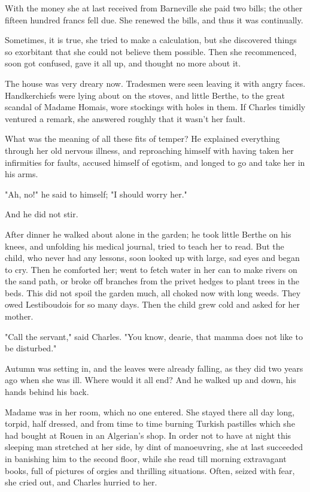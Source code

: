 \documentclass[11pt,twocolumn]{ltugboat}
\begin{document}
With the money she at last received from Barneville she paid two bills;
the other fifteen hundred francs fell due. She renewed the bills, and
thus it was continually.

Sometimes, it is true, she tried to make a calculation, but she
discovered things so exorbitant that she could not believe them
possible. Then she recommenced, soon got confused, gave it all up, and
thought no more about it.

The house was very dreary now. Tradesmen were seen leaving it with angry
faces. Handkerchiefs were lying about on the stoves, and little Berthe,
to the great scandal of Madame Homais, wore stockings with holes in
them. If Charles timidly ventured a remark, she answered roughly that it
wasn't her fault.

What was the meaning of all these fits of temper? He explained
everything through her old nervous illness, and reproaching himself with
having taken her infirmities for faults, accused himself of egotism, and
longed to go and take her in his arms.

"Ah, no!" he said to himself; "I should worry her."

And he did not stir.

After dinner he walked about alone in the garden; he took little Berthe
on his knees, and unfolding his medical journal, tried to teach her
to read. But the child, who never had any lessons, soon looked up with
large, sad eyes and began to cry. Then he comforted her; went to fetch
water in her can to make rivers on the sand path, or broke off branches
from the privet hedges to plant trees in the beds. This did not spoil
the garden much, all choked now with long weeds. They owed Lestiboudois
for so many days. Then the child grew cold and asked for her mother.

"Call the servant," said Charles. "You know, dearie, that mamma does not
like to be disturbed."

Autumn was setting in, and the leaves were already falling, as they did
two years ago when she was ill. Where would it all end? And he walked up
and down, his hands behind his back.

Madame was in her room, which no one entered. She stayed there all
day long, torpid, half dressed, and from time to time burning Turkish
pastilles which she had bought at Rouen in an Algerian's shop. In order
not to have at night this sleeping man stretched at her side, by dint of
manoeuvring, she at last succeeded in banishing him to the second floor,
while she read till morning extravagant books, full of pictures of
orgies and thrilling situations. Often, seized with fear, she cried out,
and Charles hurried to her.
\end{document}
